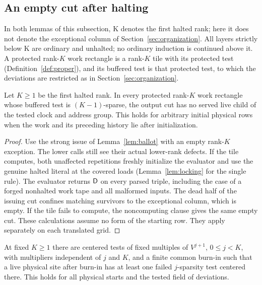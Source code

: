 \subsection{An empty cut after halting}\label{sec:cap}
In both lemmas of this subsection, K denotes the first halted rank; here it does not denote the exceptional column of Section~\ref{sec:organization}. All layers strictly below K are ordinary and unhalted; no ordinary induction is continued above it. A protected rank-\(K\) work rectangle is a rank-\(K\) tile with its protected test (Definition~\ref{def:proper}), and its buffered test is that protected test, to which the deviations are restricted as in Section~\ref{sec:organization}.

\begin{lemma}\label{lem:cap-cut}
Let \(K\ge1\) be the first halted rank. In every protected rank-\(K\) work rectangle whose buffered test is \((K-1)\)-sparse, the output cut has no served live child of the tested clock and address group. This holds for arbitrary initial physical rows when the work and its preceding history lie after initialization.
\end{lemma}

\begin{proof}
Use the strong issue of Lemma~\ref{lem:ballot} with an empty rank-\(K\) exception. The lower calls still see their actual lower-rank defects. If the tile computes, both unaffected repetitions freshly initialize the evaluator and use the genuine halted literal at the covered loads (Lemma~\ref{lem:locking} for the single rule). The evaluator returns \(\mathsf D\) on every parsed triple, including the case of a forged nonhalted work tape and all malformed inputs. The dead half of the issuing cut confines matching survivors to the exceptional column, which is empty. If the tile fails to compute, the noncomputing clause gives the same empty cut. These calculations assume no form of the starting row. They apply separately on each translated grid.
\end{proof}

\begin{lemma}\label{lem:ascent}
At fixed \(K\ge1\) there are centered tests of fixed multiples of \(V^{j+1}\), \(0\le j<K\), with multipliers independent of \(j\) and \(K\), and a finite common burn-in such that a live physical site after burn-in has at least one failed \(j\)-sparsity test centered there. This holds for all physical starts and the tested field of deviations.
\end{lemma}


